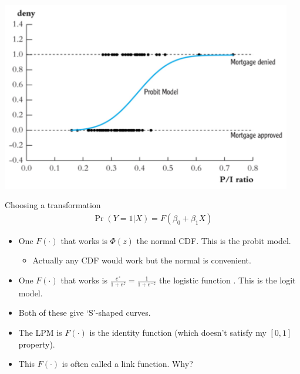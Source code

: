 \documentclass[aspectratio=169,11pt]{beamer}
\begin{document}
\begin{frame}
\begin{center}
\includegraphics[width=5in]{resources/probit.pdf}
\end{center}
\end{frame}


\begin{frame}{Choosing a transformation}
\begin{align*}
\Pr(Y=1 | X) = F(\beta_0 + \beta_1 X)
\end{align*}
\begin{itemize}
\item One $F(\cdot)$ that works is $\Phi(z)$ the normal CDF. This is the \alert{probit} model.
\begin{itemize}
\item Actually any CDF would work but the normal is convenient.
\end{itemize}
\item One $F(\cdot)$ that works is $\frac{e^z}{1+ e^z}=\frac{1}{1+e^{-z}}$ the logistic function . This is the \alert{logit} model.
\item Both of these give `S'-shaped curves.
\item The LPM is $F(\cdot)$ is the \alert{identity function} (which doesn't satisfy my $[0,1]$ property).
\item This $F(\cdot)$ is often called a \alert{link function}. Why?
\end{itemize}
\end{frame}
\end{document}
